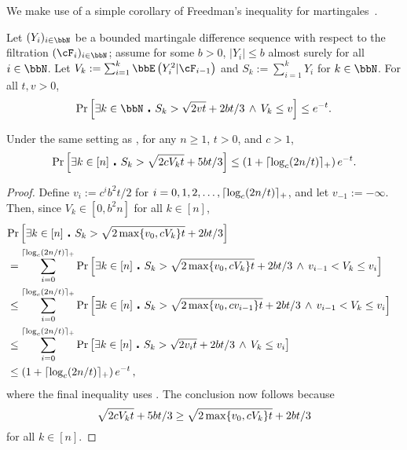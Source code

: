 We make use of a simple corollary of Freedman's inequality for
martingales~\citep[Theorem 1.6]{Fre75}.
\begin{theorem}
  \label{thm:freedman}
  Let $(Y_i)_{i \in \bbN}$ be a bounded martingale difference sequence
  with respect to the filtration $(\cF_i)_{i \in \bbN}$; assume for
  some $b>0$, $|Y_i| \leq b$ almost surely for all $i \in \bbN$.
  Let $V_k := \sum_{i=1}^k \EE{Y_i^2|\cF_{i-1}}$ and $S_k :=
  \sum_{i=1}^k Y_i$ for $k \in \bbN$.
  For all $t, v > 0$,
  \[
    \Pr\Brackets{
      \exists k \in \bbN \,\centerdot\,
      S_k > \sqrt{2vt} + 2bt/3
      \,\wedge\,
      V_k \leq v
    }
    \leq e^{-t}
    .
  \]
\end{theorem}
\begin{corollary}
  \label{cor:freedman}
  Under the same setting as , for any $n \geq 1$,
  $t > 0$, and $c > 1$,
  \[
    \Pr\left[
      \exists k \in [n] \,\centerdot\,
      S_k > \sqrt{2cV_kt} + 5bt/3
    \right]
    \leq
    \left( 1 + \lceil\log_c(2n/t)\rceil_+ \right)
    e^{-t}
    .
  \]
\end{corollary}
\begin{proof}
  Define $v_i := c^i b^2t/2$ for $i = 0, 1, 2, \dotsc, \lceil
  \log_c(2n/t) \rceil_+$, and let $v_{-1} := -\infty$.
  Then, since $V_k \in [0,b^2n]$ for all $k\in[n]$,
  \begin{align*}
    \lefteqn{
      \Pr\Brackets{
        \exists k \in [n] \,\centerdot\,
        S_k > \sqrt{2\max\braces{v_0,cV_k}t} + 2bt/3
      }
    }
    \\
    & =
    \sum_{i=0}^{\ceil{\log_c(2n/t)}_+}
    \Pr\Brackets{
      \exists k \in [n] \,\centerdot\,
      S_k > \sqrt{2\max\braces{v_0,cV_k}t} + 2bt/3
      \,\wedge\, v_{i-1} < V_k \leq v_i
    }
    \\
    & \leq
    \sum_{i=0}^{\ceil{\log_c(2n/t)}_+}
    \Pr\Brackets{
      \exists k \in [n] \,\centerdot\,
      S_k > \sqrt{2\max\braces{v_0,cv_{i-1}}t} + 2bt/3
      \,\wedge\, v_{i-1} < V_k \leq v_i
    }
    \\
    & \leq
    \sum_{i=0}^{\ceil{\log_c(2n/t)}_+}
    \Pr\Brackets{
      \exists k \in [n] \,\centerdot\,
      S_k > \sqrt{2v_it} + 2bt/3
      \,\wedge\, V_k \leq v_i
    }
    \\
    & \leq
    \Parens{ 1 + \ceil{\log_c(2n/t)}_+ }
    e^{-t}\,,
  \end{align*}
  where the final inequality uses .
  The conclusion now follows because
  \[
    \sqrt{2cV_kt} + 5bt/3
    \geq \sqrt{2\max\{v_0,cV_k\}t} + 2bt/3
  \]
  for all $k \in [n]$.
\end{proof}

